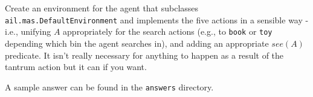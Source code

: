 \documentclass[a4]{article}
\begin{document}
\begin{sloppypar}
Create an environment for the agent that subclasses \texttt{ail.mas.DefaultEnvironment} and implements the five actions in a sensible way - i.e., unifying $A$ appropriately for the search actions (e.g., to \texttt{book} or \texttt{toy} depending which bin the agent searches in), and adding an appropriate $see(A)$ predicate.  It isn't really necessary for anything to happen as a result of the tantrum action but it can if you want.
\end{sloppypar}

A sample answer can be found in the \texttt{answers} directory.
\end{document}
